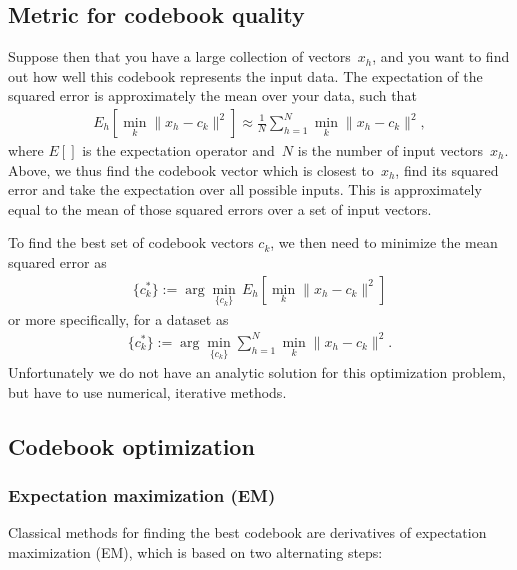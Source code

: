 \documentclass[letterpaper,10pt,english]{jupyterBook}
\begin{document}
\subsection{Metric for codebook quality}
\label{\detokenize{Modelling/Vector_quantization_VQ:metric-for-codebook-quality}}
\sphinxAtStartPar
Suppose then that you have a large collection of
vectors \(x_{h}\), and you want to find out how well this codebook
represents the input data. The expectation of the squared error is
approximately the mean over your data, such that
\begin{equation*}
\begin{split} E_h\left[ \min_k \|x_h-c_k\|^2 \right] \approx \frac 1N
\sum_{h=1}^N \min_k \|x_h-c_k\|^2, \end{split}
\end{equation*}
\sphinxAtStartPar
where \(E[ ]\) is the expectation operator and \(N\) is the number of
input vectors \(x_{h}\). Above, we thus find the codebook vector
which is closest to \(x_{h}\), find its squared error and take the
expectation over all possible inputs. This is approximately equal to the
mean of those squared errors over a set of input vectors.

\sphinxAtStartPar
To find the best set of codebook vectors \(c_{k}\), we then need
to minimize the mean squared error as
\begin{equation*}
\begin{split} \{c_k^*\} := \arg\min_{\{c_k\}}\, E_h\left[ \min_k
\|x_h-c_k\|^2 \right]  \end{split}
\end{equation*}
\sphinxAtStartPar
or more specifically, for a dataset as
\begin{equation*}
\begin{split} \{c_k^*\} := \arg\min_{\{c_k\}} \sum_{h=1}^N \min_k
\|x_h-c_k\|^2. \end{split}
\end{equation*}
\sphinxAtStartPar
Unfortunately we do not have an analytic solution for this optimization
problem, but have to use numerical, iterative methods.


\subsection{Codebook optimization}
\label{\detokenize{Modelling/Vector_quantization_VQ:codebook-optimization}}

\subsubsection{Expectation maximization (EM)}
\label{\detokenize{Modelling/Vector_quantization_VQ:expectation-maximization-em}}
\sphinxAtStartPar
Classical methods for finding the best codebook are derivatives of
expectation maximization (EM), which is based on two alternating steps:
\end{document}
